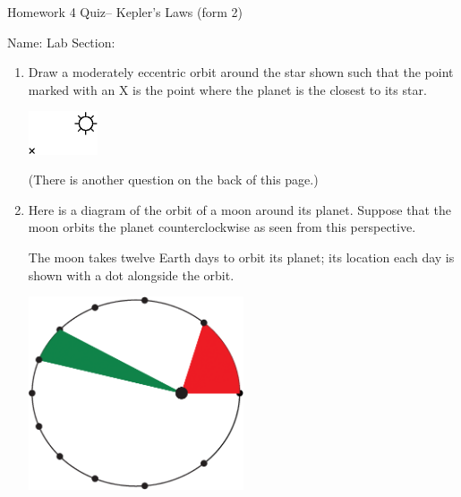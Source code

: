 \documentclass[12pt]{article}
\begin{document}
\Large

\begin{center}
	\sc \Large Homework 4 Quiz-- Kepler's Laws (form 2)
	
	Name: \underline{\hspace{2in}} Lab Section: \underline{\hspace{2in}}
\end{center}
\normalsize





\begin{enumerate}
	\item Draw a moderately eccentric orbit around the star shown such that the point marked with an X is the point where the planet is the closest to its star.
	
	\vspace{2in}
	
	\begin{center}
	\includegraphics[width=0.16\textwidth]{quiz1-crop.pdf}
	\end{center}

	\vspace{2in}

\vfill

\begin{center}

(There is another question on the back of this page.)	

\end{center}

	\newpage
	
	\item Here is a diagram of the orbit of a moon around its planet. Suppose that the moon orbits the planet counterclockwise as seen from this perspective.
	
	The moon takes twelve Earth days to orbit its planet; its location each day is shown with a dot alongside the orbit.
	
	
	\begin{center}
		\includegraphics[width=0.5\textwidth]{quiz-two-crop.png}
	\end{center}
	

\end{enumerate}
\end{document}
